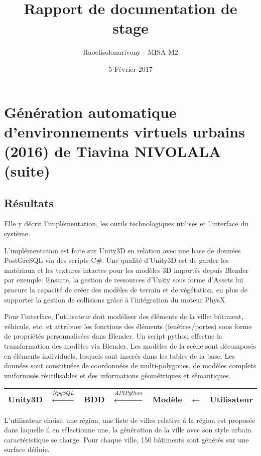 \documentclass[11pt]{article}
\title{Rapport de documentation de stage}
\author{Raoelisolonarivony - MISA M2}
\date{5 Février 2017}
\begin{document}
\maketitle

\section{Génération automatique d’environnements virtuels urbains (2016) de Tiavina NIVOLALA (suite)}

\subsection*{Résultats}

Elle y décrit l'implémentation, les outils technologiques utilisés et l'interface du système.

L'implémentation est faite sur Unity3D en relation avec une base de données PostGreSQL via des scripts C\#.
Une qualité d'Unity3D est de garder les matériaux et les textures intactes pour les modèles 3D importés depuis Blender par exemple. Ensuite, la gestion de ressources d'Unity sous forme d'Assets lui procure la capacité de créer des modèles de terrain et de végétation, en plus de supporter la gestion de collisions grâce à l'intégration du moteur PhysX. 

Pour l'interface, l'utilisateur doit modéliser des éléments de la ville: bâtiment, véhicule, etc.  et attribuer les fonctions des éléments (fenêtres/portes) sous forme de propriétés personnalisées dans Blender. Un script python effectue la transformation des modèles via Blender. Les modèles de la scène sont décomposés en éléments individuels, lesquels sont inserés dans les tables de la base. Les données sont constituées de coordonnées de multi-polygones, de modèles complets uniformisés réutilisables et des informations géométriques et sémantiques.

\begin{table}[!htbp]
\centering
\begin{tabular}{|l|}
\hline
Unity3D $\;\;\stackrel{NpgSQL}{\longleftarrow}\;\;$ BDD $\;\;\stackrel{API Python}{\longleftarrow}\;\;$ Modèle $\;\;\longleftarrow\;\;$ Utilisateur\\
\hline
\end{tabular}
\end{table}



L'utilisateur choisit une région, une liste de villes relative à la région est proposée dans laquelle il en sélectionne une, la génération de la ville avec son style urbain caractéristique se charge. Pour chaque ville, 150 bâtiments sont générés sur une surface définie.
\end{document}
